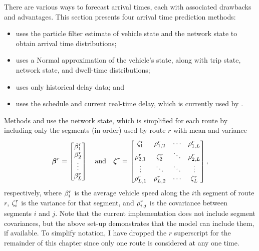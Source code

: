 There are various ways to forecast arrival times, each with associated drawbacks and advantages. This section presents four arrival time prediction methods:
\begin{itemize}
\item \Fpf{} uses the particle filter estimate of vehicle state and the network state to obtain arrival time distributions;
\item \Fnorm{} uses a Normal approximation of the vehicle's state, along with trip state, network state, and dwell-time distributions;
\item \Fhist{} uses only historical delay data; and
\item \Fsched{} uses the schedule and current real-time delay, which is currently used by \AT{}.
\end{itemize}


Methods \Fpf{} and \Fnorm{} use the network state, which is simplified for each route by including only the segments (in order) used by route $r$ with mean and variance
\begin{equation}
\label{eq:route_nw_state}
\boldsymbol\beta^r =
\begin{bmatrix}
\beta^r_1 \\
\beta^r_2 \\
\vdots \\
\beta^r_L
\end{bmatrix}\quad\text{and}\quad
\boldsymbol{\zeta}^r =
\begin{bmatrix}
\zeta^r_{1} & \rho^r_{1,2} & \cdots &\rho^r_{1,L} \\
\rho^r_{2,1} & \zeta^r_{2} & \ddots &\rho^r_{2,L} \\
\vdots & \ddots & \ddots & \vdots \\
\rho^r_{L,1} & \rho^r_{L,2} & \cdots & \zeta^r_L
\end{bmatrix},
\end{equation}
respectively, where $\beta^r_{i}$ is the average vehicle speed along the $i$th segment of route $r$, $\zeta^r_{i}$ is the variance for that segment, and $\rho^r_{i,j}$ is the covariance between segments $i$ and $j$. Note that the current implementation does not include segment covariances, but the above set-up demonstrates that the model can include them, if available. To simplify notation, I have dropped the $r$ superscript for the remainder of this chapter since only one route is considered at any one time.

